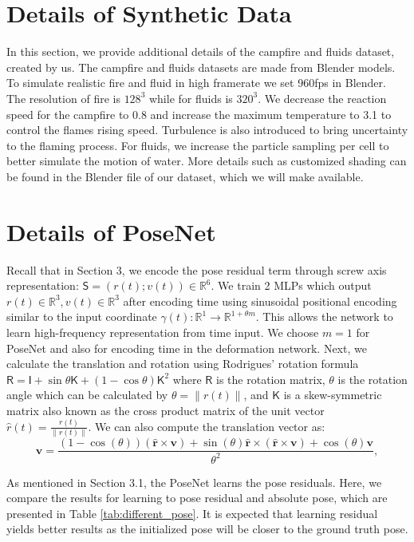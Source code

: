 \documentclass[10pt,twocolumn,letterpaper]{article}
\begin{document}
\section{Details of Synthetic Data}
In this section, we provide additional details of the campfire and fluids dataset, created by us. The campfire and fluids datasets are made from Blender models. To simulate realistic fire and fluid in high framerate we set 960fps in Blender. The resolution of fire is $128^3$ while for fluids is $320^3$. We decrease the reaction speed for the campfire to 0.8 and increase the maximum temperature to 3.1 to control the flames rising speed. Turbulence is also introduced to bring uncertainty to the flaming process. For fluids, we increase the particle sampling per cell to better simulate the motion of water. More details such as customized shading can be found in the Blender file of our dataset, which we will make available.

\section{Details of PoseNet}
Recall that in Section 3, we encode the pose residual term through screw axis representation:  $\mathsf{S}=(r(t);v(t)) \in \mathbb{R}^{6} $. We train 2 MLPs which output $r(t) \in \mathbb{R}^{3}, v(t) \in \mathbb{R}^{3} $ after encoding time using sinusoidal positional encoding similar to the input coordinate $ \gamma(t): \mathbb{R}^{1} \rightarrow \mathbb{R}^{1+\theta m} $. This allows the network to learn high-frequency representation from time input. We choose $m = 1$ for PoseNet and also for encoding time in the deformation network. Next, we calculate the translation and rotation using Rodrigues' rotation formula
$\mathsf{R} = \mathsf{I} + \sin\theta\mathsf{K} + (1-\cos\theta)\mathsf{K}^2$
where $\mathsf{R}$ is the rotation matrix, $\theta$ is the rotation angle which can be calculated by $\theta = \lVert r(t)  \rVert$, and $\mathsf{K}$ is a skew-symmetric matrix also known as the cross product matrix of the unit vector $ \hat{r}(t)  = \frac{r(t)}{\lVert r(t)  \rVert}$. We can also compute the translation vector as: 
$$\mathbf{v} = \frac{(1-\cos(\theta))(\mathbf{\hat{r}}\times\mathbf{v}) + \sin(\theta)\mathbf{\hat{r}}\times(\mathbf{\hat{r}}\times\mathbf{v}) + \cos(\theta)\mathbf{v}}{\theta^2},$$

As mentioned in Section 3.1,  the PoseNet learns the pose residuals. Here, we compare the results for learning to pose residual and absolute pose, which are presented in Table \ref{tab:different_pose}. It is expected that learning residual yields better results as the initialized pose will be closer to the ground truth pose.
\end{document}
